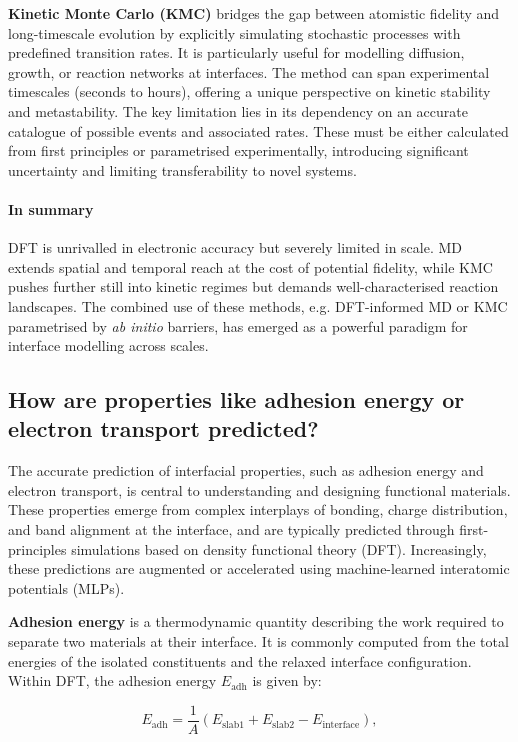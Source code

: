 \textbf{Kinetic Monte Carlo (KMC)} bridges the gap between atomistic fidelity and long-timescale evolution by
explicitly simulating stochastic processes with predefined transition rates. It is particularly useful for modelling
diffusion, growth, or reaction networks at interfaces. The method can span experimental timescales (seconds to hours),
offering a unique perspective on kinetic stability and metastability. The key limitation lies in its dependency on an
accurate catalogue of possible events and associated rates. These must be either calculated from first principles or
parametrised experimentally, introducing significant uncertainty and limiting transferability to novel systems.

\paragraph{In summary} DFT is unrivalled in electronic accuracy but severely limited in scale. MD extends spatial and
temporal reach at the cost of potential fidelity, while KMC pushes further still into kinetic regimes but demands
well-characterised reaction landscapes. The combined use of these methods, e.g. DFT-informed MD or KMC parametrised by
\textit{ab initio} barriers, has emerged as a powerful paradigm for interface modelling across scales.

\subsection{How are properties like adhesion energy or electron transport predicted?}

The accurate prediction of interfacial properties, such as adhesion energy and electron transport, is central to
understanding and designing functional materials. These properties emerge from complex interplays of bonding, charge
distribution, and band alignment at the interface, and are typically predicted through first-principles simulations
based on density functional theory (DFT). Increasingly, these predictions are augmented or accelerated using
machine-learned interatomic potentials (MLPs).

\textbf{Adhesion energy} is a thermodynamic quantity describing the work required to separate two materials at their
interface. It is commonly computed from the total energies of the isolated constituents and the relaxed interface
configuration. Within DFT, the adhesion energy $E_\mathrm{adh}$ is given by:

\[
    E_\mathrm{adh} = \frac{1}{A} \left( E_\mathrm{slab1} + E_\mathrm{slab2} - E_\mathrm{interface} \right),
\]

